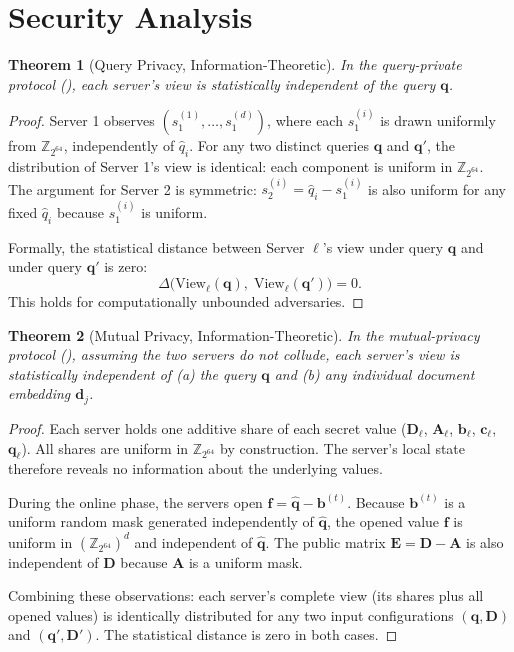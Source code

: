 \documentclass[11pt]{article}
\newtheorem{theorem}{Theorem}[section]
\newcommand{\Z}{\mathbb{Z}}
\begin{document}
\section{Security Analysis}
\label{sec:security}

\begin{theorem}[Query Privacy, Information-Theoretic]
\label{thm:query-privacy}
In the query-private protocol (), each server's view is statistically independent of the query $\mathbf{q}$.
\end{theorem}

\begin{proof}
Server 1 observes $(s_1^{(1)}, \ldots, s_1^{(d)})$, where each $s_1^{(i)}$ is drawn uniformly from $\Z_{2^{64}}$, independently of $\hat{q}_i$. For any two distinct queries $\mathbf{q}$ and $\mathbf{q}'$, the distribution of Server 1's view is identical: each component is uniform in $\Z_{2^{64}}$. The argument for Server 2 is symmetric: $s_2^{(i)} = \hat{q}_i - s_1^{(i)}$ is also uniform for any fixed $\hat{q}_i$ because $s_1^{(i)}$ is uniform.

Formally, the statistical distance between Server $\ell$'s view under query $\mathbf{q}$ and under query $\mathbf{q}'$ is zero:
\[
\Delta\bigl(\text{View}_\ell(\mathbf{q}),\; \text{View}_\ell(\mathbf{q}')\bigr) = 0.
\]
This holds for computationally unbounded adversaries.
\end{proof}

\begin{theorem}[Mutual Privacy, Information-Theoretic]
\label{thm:mutual-privacy}
In the mutual-privacy protocol (), assuming the two servers do not collude, each server's view is statistically independent of (a) the query $\mathbf{q}$ and (b) any individual document embedding $\mathbf{d}_j$.
\end{theorem}

\begin{proof}
Each server holds one additive share of each secret value ($\mathbf{D}_\ell$, $\mathbf{A}_\ell$, $\mathbf{b}_\ell$, $\mathbf{c}_\ell$, $\mathbf{q}_\ell$). All shares are uniform in $\Z_{2^{64}}$ by construction. The server's local state therefore reveals no information about the underlying values.

During the online phase, the servers open $\mathbf{f} = \hat{\mathbf{q}} - \mathbf{b}^{(t)}$. Because $\mathbf{b}^{(t)}$ is a uniform random mask generated independently of $\hat{\mathbf{q}}$, the opened value $\mathbf{f}$ is uniform in $(\Z_{2^{64}})^d$ and independent of $\hat{\mathbf{q}}$. The public matrix $\mathbf{E} = \mathbf{D} - \mathbf{A}$ is also independent of $\mathbf{D}$ because $\mathbf{A}$ is a uniform mask.

Combining these observations: each server's complete view (its shares plus all opened values) is identically distributed for any two input configurations $(\mathbf{q}, \mathbf{D})$ and $(\mathbf{q}', \mathbf{D}')$. The statistical distance is zero in both cases.
\end{proof}
\end{document}
